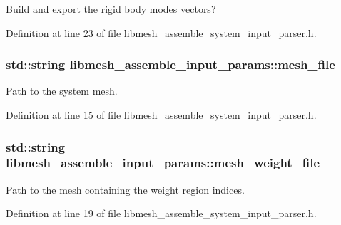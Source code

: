 Build and export the rigid body modes vectors? 



Definition at line 23 of file libmesh\+\_\+assemble\+\_\+system\+\_\+input\+\_\+parser.\+h.

\hypertarget{structlibmesh__assemble__input__params_aaacb1a941decf01232ab3c5bd9b3bacf}{}
\subsubsection[{mesh\+\_\+file}]{\setlength{\rightskip}{0pt plus 5cm}std\+::string libmesh\+\_\+assemble\+\_\+input\+\_\+params\+::mesh\+\_\+file}\label{structlibmesh__assemble__input__params_aaacb1a941decf01232ab3c5bd9b3bacf}


Path to the system mesh. 



Definition at line 15 of file libmesh\+\_\+assemble\+\_\+system\+\_\+input\+\_\+parser.\+h.

\hypertarget{structlibmesh__assemble__input__params_abac50ee0db80bff6bb89d017d1fdc27b}{}
\subsubsection[{mesh\+\_\+weight\+\_\+file}]{\setlength{\rightskip}{0pt plus 5cm}std\+::string libmesh\+\_\+assemble\+\_\+input\+\_\+params\+::mesh\+\_\+weight\+\_\+file}\label{structlibmesh__assemble__input__params_abac50ee0db80bff6bb89d017d1fdc27b}


Path to the mesh containing the weight region indices. 



Definition at line 19 of file libmesh\+\_\+assemble\+\_\+system\+\_\+input\+\_\+parser.\+h.

\hypertarget{structlibmesh__assemble__input__params_af6d7a41287b40d913e5110b115b0b692}{}
